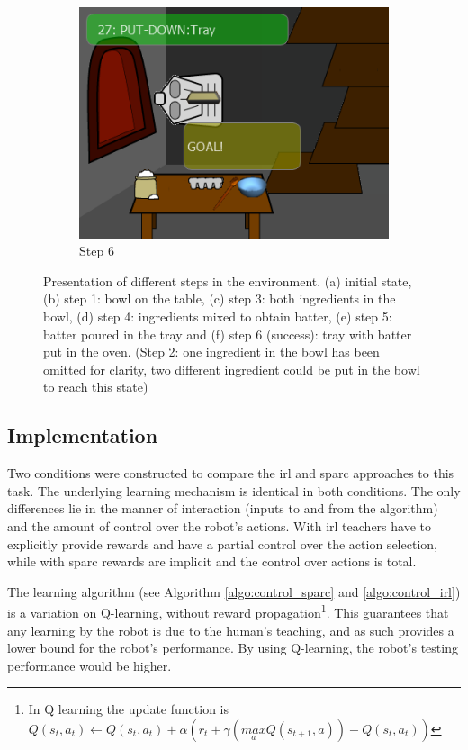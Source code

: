 \begin{figure}[ht]
\begin{subfigure}[b]{0.325\textwidth}
		\includegraphics[width=\textwidth]{step6.png}
		\caption{Step 6}
		\label{fig:control_goal}
	\end{subfigure}
	
	\caption{Presentation of different steps in the environment. (a) initial state, (b) step 1: bowl on the table, (c) step 3: both ingredients in the bowl, (d) step 4: ingredients mixed to obtain batter, (e) step 5: batter poured in the tray and (f) step 6 (success): tray with batter put in the oven. (Step 2: one ingredient in the bowl has been omitted for clarity, two different ingredient could be put in the bowl to reach this state)}
	\label{fig:control_states}
\end{figure}

\subsection{Implementation}

Two conditions were constructed to compare the \gls{irl} and \gls{sparc} approaches to this task. The underlying learning mechanism is identical in both conditions. The only differences lie in the manner of interaction (inputs to and from the algorithm) and the amount of control over the robot's actions. With \gls{irl} teachers have to explicitly provide rewards and have a partial control over the action selection, while with \gls{sparc} rewards are implicit and the control over actions is total. 

The learning algorithm (see Algorithm \ref{algo:control_sparc} and \ref{algo:control_irl}) is a variation on Q-learning, without reward propagation\footnote{In Q learning the update function is $Q(s_{t},a_{t}) \leftarrow Q(s_{t},a_{t}) + \alpha (r_{t}+\gamma (\underset{a}{max} Q(s_{t+1},a))-Q(s_{t},a_{t}))$}. This guarantees that any learning by the robot is due to the human's teaching, and as such provides a lower bound for the robot's performance. By using Q-learning, the robot's testing performance would be higher.

